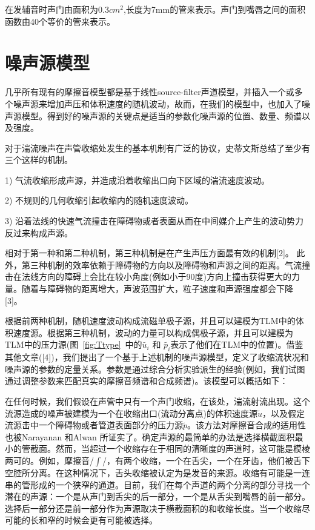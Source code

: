 在发辅音时声门由面积为0.3$cm^2$,长度为7mm的管来表示。声门到嘴唇之间的面积函数由40个等价的管来表示。

\section{噪声源模型}
几乎所有现有的摩擦音模型都是基于线性source-filter声道模型，并插入一个或多个噪声源来增加声压和体积速度的随机波动，故而，在我们的模型中，也加入了噪声源模型。得到好的噪声源的关键点是适当的参数化噪声源的位置、数量、频谱以及强度。


对于湍流噪声在声管收缩处发生的基本机制有广泛的协议，史蒂文斯总结了至少有三个这样的机制。


1)	气流收缩形成声源，并造成沿着收缩出口向下区域的湍流速度波动。


2)	不规则的几何收缩引起收缩内的随机速度波动。


3)	沿着法线的快速气流撞击在障碍物或者表面从而在中间媒介上产生的波动势力反过来构成声源。


相对于第一种和第二种机制，第三种机制是在产生声压方面最有效的机制[2]。
此外，第三种机制的效率依赖于障碍物的方向以及障碍物和声源之间的距离。气流撞击在法线方向的障碍上会比在较小角度(例如小于90度)方向上撞击获得更大的力量。随着与障碍物的距离增大，声波范围扩大，粒子速度和声源强度都会下降[3]。


根据前两种机制，随机速度波动构成流磁单极子源，并且可以建模为TLM中的体积速度源。根据第三种机制，波动的力量可以构成偶极子源，并且可以建模为TLM中的压力源(图~\ref{fig:Ttype}~中的$\tilde{u_i}$ 和 $\tilde{p_i}$表示了他们在TLM中的位置)。借鉴其他文章([4])，我们提出了一个基于上述机制的噪声源模型，定义了收缩流状况和噪声源的参数的定量关系。参数是通过综合分析实验派生的经验(例如，我们试图通过调整参数来匹配真实的摩擦音频谱和合成频谱)。该模型可以概括如下：


在任何时候，我们假设在声管中只有一个声门收缩，在该处，湍流射流出现。这个流源造成的噪声被建模为一个在收缩出口(流动分离点)的体积速度源$\tilde{u}$，以及假定流源击中一个障碍物或者管道表面部分的压力源$\tilde{p}$。该方法对摩擦音合成的适用性也被Narayanan 和Alwan 所证实了。确定声源的最简单的办法是选择横截面积最小的管截面。然而，当超过一个收缩存在于相同的清晰度的声道时，这可能是模棱两可的。例如，摩擦音/$\int$/，有两个收缩，一个在舌尖，一个在牙齿，他们被舌下空腔所分离。在这种情况下，舌头收缩被认定为是发音的来源。收缩有可能是一连串的管形成的一个狭窄的通道。目前，我们在每个声道的两个分离的部分寻找一个潜在的声源：一个是从声门到舌尖的后一部分，一个是从舌尖到嘴唇的前一部分。选择后一部分还是前一部分作为声源取决于横截面积的和收缩长度。当一个收缩尽可能的长和窄的时候会更有可能被选择。


